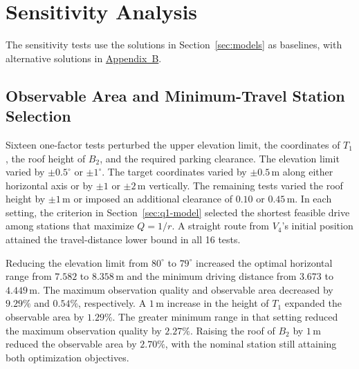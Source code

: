 \documentclass{swmcmthesis}
\begin{document}
\section{Sensitivity Analysis}
\label{sec:sensitivity}

The sensitivity tests use the solutions in Section~\ref{sec:models} as baselines, with alternative solutions in \hyperref[app:alternatives]{Appendix~B}.

\subsection{Observable Area and Minimum-Travel Station Selection}
\label{sec:q1-sensitivity}

Sixteen one-factor tests perturbed the upper elevation limit, the coordinates of \(T_1\), the roof height of \(B_2\), and the required parking clearance. The elevation limit varied by \(\pm0.5^\circ\) or \(\pm1^\circ\). The target coordinates varied by \(\pm0.5\,\mathrm m\) along either horizontal axis or by \(\pm1\) or \(\pm2\,\mathrm m\) vertically. The remaining tests varied the roof height by \(\pm1\,\mathrm m\) or imposed an additional clearance of \(0.10\) or \(0.45\,\mathrm m\). In each setting, the criterion in Section~\ref{sec:q1-model} selected the shortest feasible drive among stations that maximize \(Q=1/r\). A straight route from \(V_4\)'s initial position attained the travel-distance lower bound in all 16 tests.

Reducing the elevation limit from \(80^\circ\) to \(79^\circ\) increased the optimal horizontal range from \(7.582\) to \(8.358\,\mathrm m\) and the minimum driving distance from \(3.673\) to \(4.449\,\mathrm m\). The maximum observation quality and observable area decreased by \(9.29\%\) and \(0.54\%\), respectively. A \(1\,\mathrm m\) increase in the height of \(T_1\) expanded the observable area by \(1.29\%\). The greater minimum range in that setting reduced the maximum observation quality by \(2.27\%\). Raising the roof of \(B_2\) by \(1\,\mathrm m\) reduced the observable area by \(2.70\%\), with the nominal station still attaining both optimization objectives.
\end{document}
